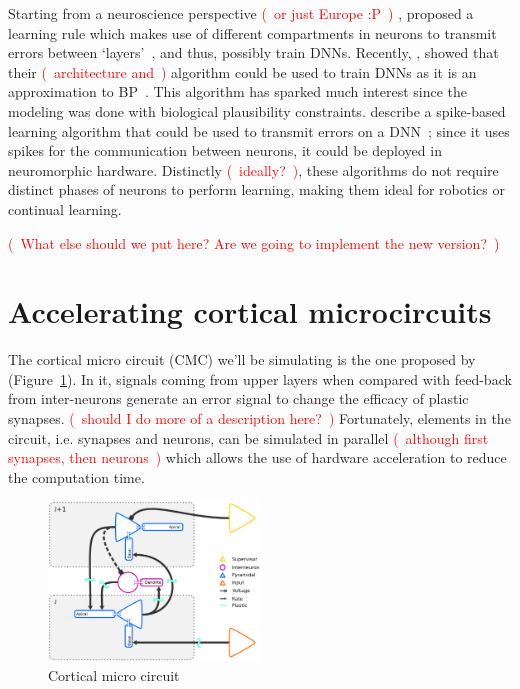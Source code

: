\documentclass{article}
\newcommand\note[1]{\textcolor{red}{(~#1~)}}
\begin{document}
Starting from a neuroscience perspective \note{or just Europe :P} , \citeauthor{urbanczik} proposed a learning rule which makes use of different compartments in neurons to transmit errors between `layers'~\cite{urbanczik}, and thus, possibly train DNNs.
Recently, \citeauthor{sacramento}, showed that their \note{architecture and} algorithm could be used to train DNNs as it is an approximation to BP~\citep{sacramento}.
This algorithm has sparked much interest since the modeling was done with biological plausibility constraints.
\citeauthor{cartiglia_snn_prop} describe a spike-based learning algorithm that could be used to transmit errors on a DNN~\citep{cartiglia_snn_prop}; since it uses spikes for the communication between neurons, it could be deployed in neuromorphic hardware.
Distinctly \note{ideally?}, these algorithms do not require distinct phases of neurons to perform learning, making them ideal for robotics or continual learning.


\note{What else should we put here? Are we going to implement the new version?}

\section{Accelerating cortical microcircuits}
\label{sec:accelerating-microcircuit}
The cortical micro circuit (CMC) we'll be simulating is the one proposed by \citeauthor{sacramento} (Figure~\ref{fig:micro-circuit}).
In it, signals coming from upper layers when compared with feed-back from inter-neurons generate an error signal to change the efficacy of plastic synapses.
\note{should I do more of a description here?}
Fortunately, elements in the circuit, i.e. synapses and neurons, can be simulated in parallel \note{although first synapses, then neurons} which allows the use of hardware acceleration to reduce the computation time.

\begin{figure}[h!bt]
    \centering
    \includegraphics[width=0.5\textwidth]{neuron_models.png}
    \caption{Cortical micro circuit}
    \label{fig:micro-circuit}
\end{figure}
\end{document}
